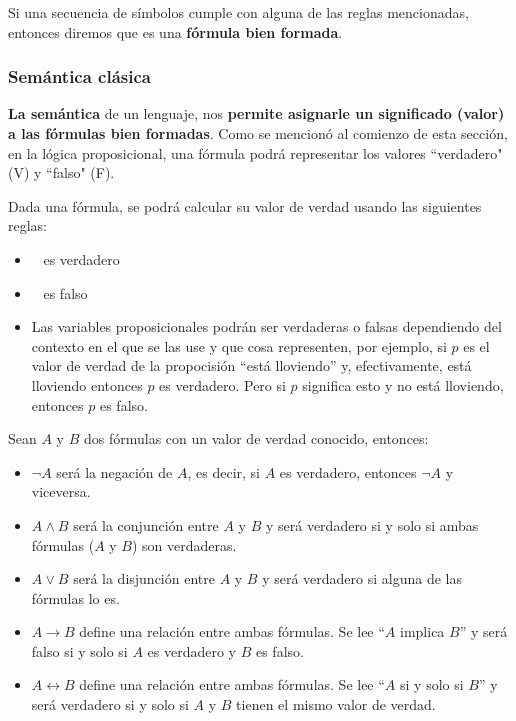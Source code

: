 Si una secuencia de símbolos cumple con alguna de las reglas mencionadas, entonces diremos que es una \textbf{fórmula bien formada}.
\subsubsection*{Semántica clásica}
\textbf{La semántica} de un lenguaje, nos \textbf{permite asignarle un significado (valor) a las fórmulas bien formadas}. Como se mencionó al comienzo de esta sección, en la lógica proposicional, una fórmula podrá representar los valores ``verdadero" (V) y ``falso" (F).

Dada una fórmula, se podrá calcular su valor de verdad usando las siguientes reglas:
\begin{itemize}
	\item \True~ es verdadero
	\item \False~ es falso
	\item Las variables proposicionales podrán ser verdaderas o falsas dependiendo del contexto en el que se las use y que cosa representen, por ejemplo, si $p$ es el valor de verdad de la propocisión ``está lloviendo'' y, efectivamente, está lloviendo entonces $p$ es verdadero. Pero si $p$ significa esto y no está lloviendo, entonces $p$ es falso.
\end{itemize}

Sean $A$ y $B$ dos fórmulas con un valor de verdad conocido, entonces:

\begin{itemize}
	\item $\lnot A$ será la negación de $A$, es decir, si $A$ es verdadero, entonces $\lnot A$ y viceversa.
	\item $A \land B$ será la conjunción entre $A$ y $B$ y será verdadero si y solo si ambas fórmulas ($A$ y $B$) son verdaderas.
	\item $A \lor B$ será la disjunción entre $A$ y $B$ y será verdadero si alguna de las fórmulas lo es.
	\item $A \rightarrow B$ define una relación entre ambas fórmulas. Se lee ``$A$ implica $B$'' y será falso si y solo si $A$ es verdadero y $B$ es falso.
	\item $A \leftrightarrow B$ define una relación entre ambas fórmulas. Se lee ``$A$ si y solo si $B$'' y será verdadero si y solo si $A$ y $B$ tienen el mismo valor de verdad.
\end{itemize}

